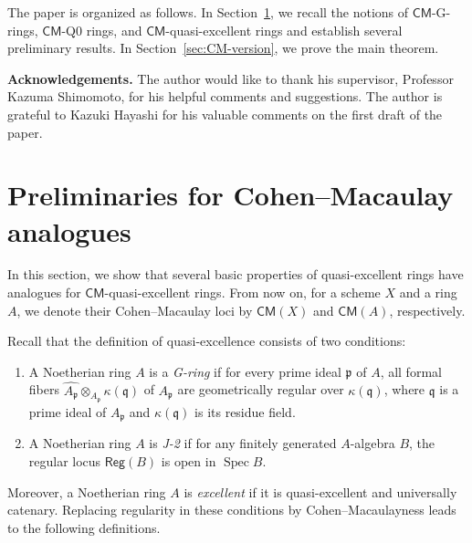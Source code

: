 \documentclass[a4paper, 11pt]{amsart}
\theoremstyle{definition}
\newcommand{\Spec}{\operatorname{Spec}}
\renewcommand{\hat}[1]{\widehat{#1}}
\begin{document}
The paper is organized as follows. In Section~\ref{sec:preliminaries}, we recall the notions of $\mathsf{CM}$-G-rings, $\mathsf{CM}$-Q0 rings, and $\mathsf{CM}$-quasi-excellent rings and establish several preliminary results. In Section~\ref{sec:CM-version}, we prove the main theorem.

\medskip

\noindent
\textbf{Acknowledgements.} The author would like to thank his supervisor, Professor Kazuma Shimomoto, for his helpful comments and suggestions. The author is grateful to Kazuki Hayashi for his valuable comments on the first draft of the paper. 


\section{Preliminaries for Cohen--Macaulay analogues}\label{sec:preliminaries}

In this section, we show that several basic properties of quasi-excellent rings have analogues for $\mathsf{CM}$-quasi-excellent rings. From now on, for a scheme $X$ and a ring $A$, we denote their Cohen--Macaulay loci by $\mathsf{CM}(X)$ and $\mathsf{CM}(A)$, respectively.

Recall that the definition of quasi-excellence consists of two conditions:
\begin{enumerate}
    \item[(G-ring)] A Noetherian ring $A$ is a \emph{G-ring} if for every prime ideal $\mathfrak{p}$ of $A$, all formal fibers $\hat{A_\mathfrak{p}} \otimes_{A_\mathfrak{p}} \kappa(\mathfrak{q})$ of $A_\mathfrak{p}$ are geometrically regular over $\kappa(\mathfrak{q})$, where $\mathfrak q$ is a prime ideal of $A_\mathfrak p$ and $\kappa(\mathfrak q)$ is its residue field.
    \item[(J-2)] A Noetherian ring $A$ is \emph{J-2} if for any finitely generated $A$-algebra $B$, the regular locus $\mathsf{Reg}(B)$ is open in $\Spec B$. 
\end{enumerate}
Moreover, a Noetherian ring $A$ is \emph{excellent} if it is quasi-excellent and universally catenary. Replacing regularity in these conditions by Cohen–Macaulayness leads to the following definitions.
\end{document}
